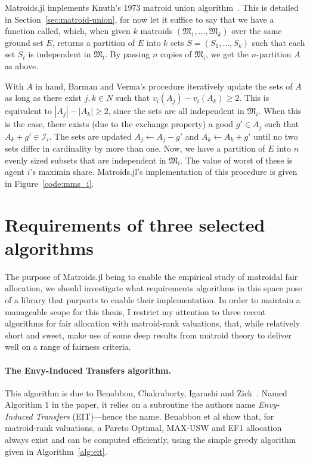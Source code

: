 Matroids.jl implements Knuth's 1973 matroid union algorithm~\cite{knuth1973matroidpartitioning}. This is detailed in Section~\ref{sec:matroid-union}, for now let it suffice to say that we have a function called\linebreak{}, which, when given $k$ matroids $(\mathfrak{M}_1,\dots,\mathfrak{M}_k)$ over the same ground set $E$, returns a partition of $E$ into $k$ sets $S = (S_1, \dots, S_k)$ such that each set $S_t$ is independent in $\mathfrak{M}_t$. By passing $n$ copies of $\mathfrak{M}_i$, we get the $n$-partition $A$ as above.

With $A$ in hand, Barman and Verma's procedure iteratively update the sets of $A$ as long as there exist $j, k \in N$ such that $v_i(A_j) - v_i(A_k) \geq 2$. This is equivalent to $|A_j| - |A_k| \geq 2$, since the sets are all independent in $\mathfrak{M}_i$. When this is the case, there exists (due to the exchange property) a good $g'\in A_j$ such that $A_k + g' \in \mathcal{I}_i$. The sets are updated $A_j \leftarrow A_j - g'$ and $A_k \leftarrow A_k + g'$ until no two sets differ in cardinality by more than one. Now, we have a partition of $E$ into $n$ evenly sized subsets that are independent in $\mathfrak{M}_i$. The value of worst of these is agent $i$'s maximin share. Matroids.jl's implementation of this procedure is given in Figure~\ref{code:mms_i}.




\section{Requirements of three selected algorithms}
The purpose of Matroids.jl being to enable the empirical study of matroidal fair allocation, we should investigate what requirements algorithms in this space pose of a library that purports to enable their implementation. In order to maintain a manageable scope for this thesis, I restrict my attention to three recent algorithms for fair allocation with matroid-rank valuations, that, while relatively short and sweet, make use of some deep results from matroid theory to deliver well on a range of fairness criteria.

\paragraph{The Envy-Induced Transfers algorithm.} This algorithm is due to Benabbou, Chakraborty, Igarashi and Zick~\cite{benabbou-2021}. Named Algorithm 1 in the paper, it relies on a subroutine the authors name \textit{Envy-Induced Transfers} (EIT)---hence the name. Benabbou et al show that, for matroid-rank valuations, a Pareto Optimal, MAX-USW and EF1 allocation always exist and can be computed efficiently, using the simple greedy algorithm given in Algorithm~\ref{alg:eit}.


